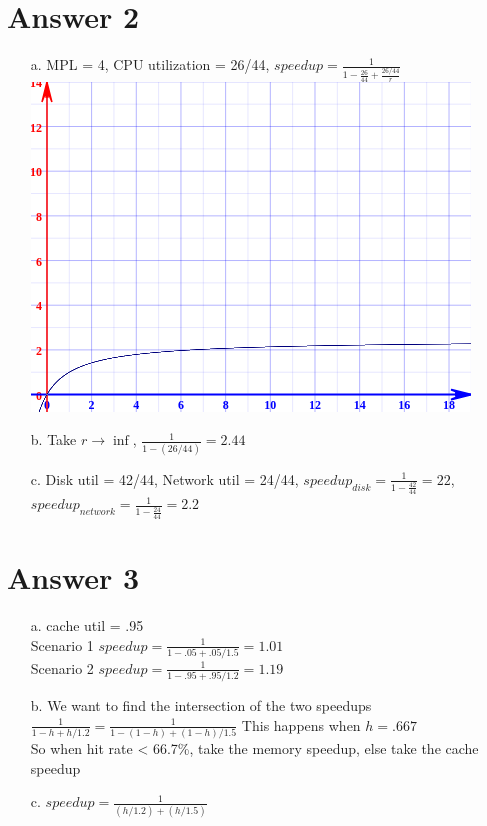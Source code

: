 \documentclass[11pt]{article}
\theoremstyle{definition}
\begin{document}
\section*{Answer 2}
\begin{enumerate}
	\item[a.] MPL = 4, CPU utilization = 26/44, $speedup = \frac{1}{1-\frac{26}{44} + \frac{26/44}{r}}$\\
	\includegraphics*[scale=0.5]{2plot.png}
	\item[b.] Take $r \rightarrow \inf$, $\frac{1}{1 - (26/44)} = 2.44$
	\item[c.] Disk util = 42/44, Network util = 24/44, $speedup_{disk} = \frac{1}{1 - \frac{42}{44}} = 22$, $speedup_{network} = \frac{1}{1 - \frac{24}{44}} = 2.2$
\end{enumerate}

\section*{Answer 3}
\begin{enumerate}
	\item[a.] cache util = .95\\
	Scenario 1 $speedup = \frac{1}{1 - .05 + .05 / 1.5} = 1.01$\\
	Scenario 2 $speedup = \frac{1}{1 - .95 + .95 / 1.2} = 1.19$\\

	\item[b.] We want to find the intersection of the two speedups\\
	$\frac{1}{1 - h + h/1.2} = \frac{1}{1 - (1-h) + (1-h)/1.5}$ This happens when $h = .667$\\
	So when hit rate < 66.7\%, take the memory speedup, else take the cache speedup

	\item[c.] $speedup = \frac{1}{(h/1.2) + (h/1.5)}$
\end{enumerate}
\end{document}
